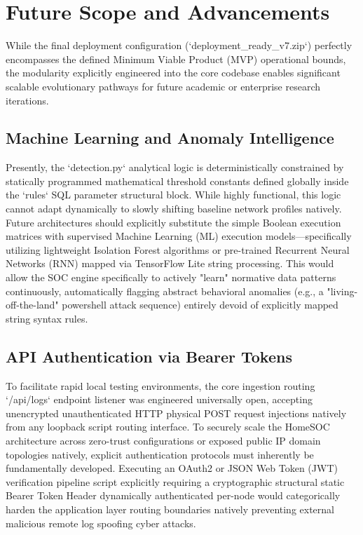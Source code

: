 \section{Future Scope and Advancements}
While the final deployment configuration (`deployment\_ready\_v7.zip`) perfectly encompasses the defined Minimum Viable Product (MVP) operational bounds, the modularity explicitly engineered into the core codebase enables significant scalable evolutionary pathways for future academic or enterprise research iterations.

\subsection{Machine Learning and Anomaly Intelligence}
Presently, the `detection.py` analytical logic is deterministically constrained by statically programmed mathematical threshold constants defined globally inside the `rules` SQL parameter structural block. While highly functional, this logic cannot adapt dynamically to slowly shifting baseline network profiles natively. Future architectures should explicitly substitute the simple Boolean execution matrices with supervised Machine Learning (ML) execution models—specifically utilizing lightweight Isolation Forest algorithms or pre-trained Recurrent Neural Networks (RNN) mapped via TensorFlow Lite string processing. This would allow the SOC engine specifically to actively "learn" normative data patterns continuously, automatically flagging abstract behavioral anomalies (e.g., a "living-off-the-land" powershell attack sequence) entirely devoid of explicitly mapped string syntax rules.

\subsection{API Authentication via Bearer Tokens}
To facilitate rapid local testing environments, the core ingestion routing `/api/logs` endpoint listener was engineered universally open, accepting unencrypted unauthenticated HTTP physical POST request injections natively from any loopback script routing interface. To securely scale the HomeSOC architecture across zero-trust configurations or exposed public IP domain topologies natively, explicit authentication protocols must inherently be fundamentally developed. Executing an OAuth2 or JSON Web Token (JWT) verification pipeline script explicitly requiring a cryptographic structural static Bearer Token Header dynamically authenticated per-node would categorically harden the application layer routing boundaries natively preventing external malicious remote log spoofing cyber attacks.

